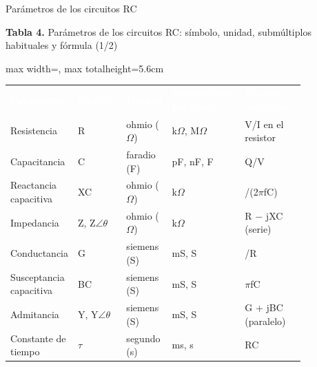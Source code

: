 \documentclass[aspectratio=169,11pt,xcolor={table}]{beamer}
\begin{document}
\begin{frame}{Parámetros de los circuitos RC}
\begin{center}
{\scriptsize\textbf{Tabla 4.} Parámetros de los circuitos RC: símbolo, unidad, submúltiplos habituales y fórmula (1/2)\par}
\vspace{1mm}
\scriptsize
\renewcommand{\arraystretch}{1.35}
\begin{adjustbox}{max width=\linewidth, max totalheight=5.6cm}
\begin{tabular}{>{\raggedright\arraybackslash}p{0.194\linewidth}>{\raggedright\arraybackslash}p{0.060\linewidth}>{\raggedright\arraybackslash}p{0.161\linewidth}>{\raggedright\arraybackslash}p{0.167\linewidth}>{\raggedright\arraybackslash}p{0.268\linewidth}}
\rowcolor{iubnavy} \textcolor{white}{\textbf{Parámetro}} & \textcolor{white}{\textbf{Símbolo}} & \textcolor{white}{\textbf{Unidad}} & \textcolor{white}{\textbf{Submúltiplos habituales}} & \textcolor{white}{\textbf{Fórmula o definición}} \\
Resistencia & R & ohmio (\ensuremath{\Omega}) & k\ensuremath{\Omega}, M\ensuremath{\Omega} & V/I en el resistor \\
\rowcolor{iubfondogris} Capacitancia & C & faradio (F) & pF, nF, \textmu{}F & Q/V \\
Reactancia capacitiva & XC & ohmio (\ensuremath{\Omega}) & k\ensuremath{\Omega} & 1/(2\ensuremath{\pi}fC) \\
\rowcolor{iubfondogris} Impedancia & Z, Z\ensuremath{\angle}\ensuremath{\theta} & ohmio (\ensuremath{\Omega}) & k\ensuremath{\Omega} & R \ensuremath{-} jXC (serie) \\
Conductancia & G & siemens (S) & mS, \textmu{}S & 1/R \\
\rowcolor{iubfondogris} Susceptancia capacitiva & BC & siemens (S) & mS, \textmu{}S & 2\ensuremath{\pi}fC \\
Admitancia & Y, Y\ensuremath{\angle}\ensuremath{\theta} & siemens (S) & mS, \textmu{}S & G + jBC (paralelo) \\
\rowcolor{iubfondogris} Constante de tiempo & \ensuremath{\tau} & segundo (s) & ms, \textmu{}s & RC \\
\bottomrule
\end{tabular}
\end{adjustbox}
\end{center}
\end{frame}
\end{document}
